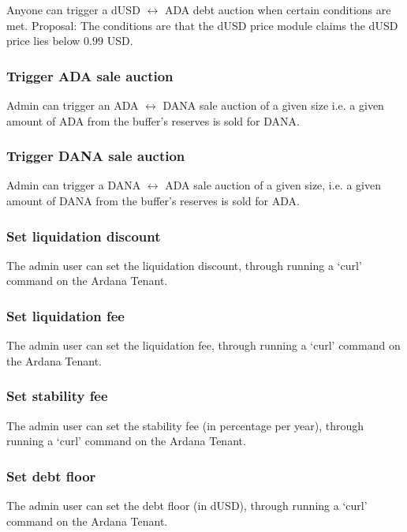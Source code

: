 \documentclass{article} %
\begin{document}
Anyone can trigger a dUSD $\leftrightarrow$ ADA debt auction when certain
conditions are met.
Proposal: The conditions are that the dUSD price module claims the dUSD price
lies below $0.99$ USD.

\subsubsection{Trigger ADA sale auction}

Admin can trigger an ADA $\leftrightarrow$ DANA sale auction of a given size
i.e. a given amount of ADA from the buffer's reserves is sold for DANA.

\subsubsection{Trigger DANA sale auction}

Admin can trigger a DANA $\leftrightarrow$ ADA sale auction of a given size,
i.e. a given amount of DANA from the buffer's reserves is sold for ADA.

\subsubsection{Set liquidation discount}

The admin user can set the liquidation discount, through running a `curl'
command on the Ardana Tenant.

\subsubsection{Set liquidation fee}

The admin user can set the liquidation fee, through running a `curl' command on
the Ardana Tenant.

\subsubsection{Set stability fee}

The admin user can set the stability fee (in percentage per year), through
running a `curl' command on the Ardana Tenant.

\subsubsection{Set debt floor}

The admin user can set the debt floor (in dUSD), through running a `curl'
command on the Ardana Tenant.
\end{document}

